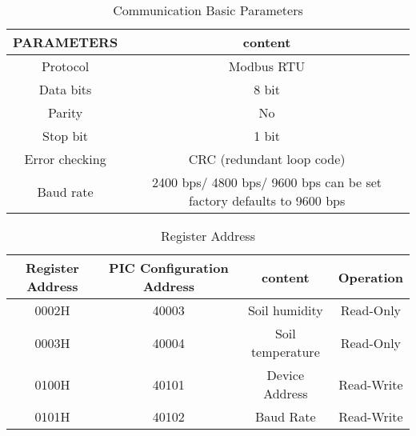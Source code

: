\documentclass[11pt]{article}
\begin{document}
\begin{table}
    \centering
    \caption{Communication Basic Parameters}
    \label{t1}
    \resizebox{\textwidth}{!}
    {%
    \begin{tabular}{|c|c|}
    \noalign{\smallskip}\noalign{\smallskip}\hline
    PARAMETERS & content \\
    \hline
    Protocol & Modbus RTU \\
    \hline
    Data bits & 8 bit \\
    \hline
    Parity  & No \\
    \hline
    Stop bit  & 1 bit \\
    \hline
    Error checking  & CRC (redundant loop code) \\
    \hline
    Baud rate  & 2400 bps/ 4800 bps/ 9600 bps can be set factory defaults to 9600 bps\\
    \hline
    \end{tabular}
    }
\end{table}

\begin{table}
    \centering
    \caption{Register Address}
    \label{t2}
    \resizebox{\textwidth}{!}
    {
    \begin{tabular}{|c|c|c|c|}
    \noalign{\smallskip}\noalign{\smallskip}\hline
    Register Address & PIC Configuration Address & content & Operation \\
    \hline
    0002H & 40003 & Soil humidity & Read-Only \\
    \hline
    0003H & 40004 & Soil temperature & Read-Only \\
    \hline
    0100H & 40101 & Device Address & Read-Write \\
    \hline
    0101H & 40102 & Baud Rate & Read-Write \\
    \hline    
    \end{tabular}
    }
\end{table}
\end{document}
